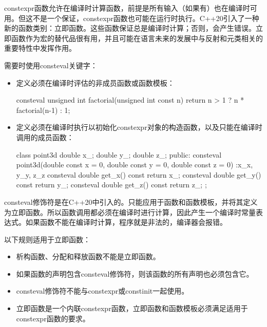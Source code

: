 

constexpr函数允许在编译时计算函数，前提是所有输入（如果有）也在编译时可用。但这不是一个保证，constexpr函数也可能在运行时执行。C++20引入了一种新的函数类别：立即函数。这些函数保证总是编译时计算；否则，会产生错误。立即函数作为宏的替代品很有用，并且可能在语言未来的发展中与反射和元类相关的重要特性中发挥作用。


需要时使用consteval关键字：

\begin{itemize}
\item
定义必须在编译时评估的非成员函数或函数模板：

\begin{cpp}
consteval unsigned int factorial(unsigned int const n)
{
    return n > 1 ? n * factorial(n-1) : 1;
}
\end{cpp}

\item
定义必须在编译时执行以初始化constexpr对象的构造函数，以及只能在编译时调用的成员函数：

\begin{cpp}
class point3d
{
    double x_;
    double y_;
    double z_;
public:
    consteval point3d(double const x = 0,
    double const y = 0,
    double const z = 0)
    :x_{x}, y_{y}, z_{z}
    {}
    consteval double get_x() const {return x_;}
    consteval double get_y() const {return y_;}
    consteval double get_z() const {return z_;}
};
\end{cpp}
\end{itemize}


consteval修饰符是在C++20中引入的。只能应用于函数和函数模板，并将其定义为立即函数。所以函数调用都必须在编译时进行计算，因此产生一个编译时常量表达式。如果函数不能在编译时计算，程序就是非法的，编译器会报错。

以下规则适用于立即函数：

\begin{itemize}
\item
析构函数、分配和释放函数不能是立即函数。

\item
如果函数的声明包含consteval修饰符，则该函数的所有声明也必须包含它。

\item
consteval修饰符不能与constexpr或constinit一起使用。

\item
立即函数是一个内联constexpr函数，立即函数和函数模板必须满足适用于constexpr函数的要求。
\end{itemize}

